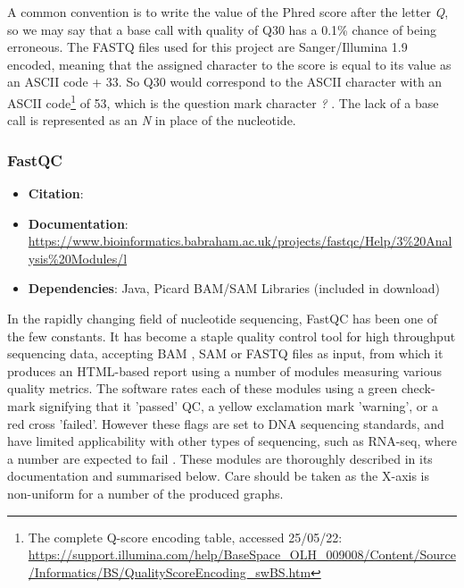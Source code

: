 A common convention is to write the value of the Phred score after the letter \textit{Q}, so we may say that a base call with quality of Q30 has a 0.1\% chance of being erroneous. The FASTQ files used for this project are Sanger/Illumina 1.9 encoded, meaning that the assigned character to the score is equal to its value as an ASCII code + 33. So Q30 would correspond to the ASCII character with an ASCII code\footnote{The complete Q-score encoding table, accessed 25/05/22: \url{https://support.illumina.com/help/BaseSpace_OLH_009008/Content/Source/Informatics/BS/QualityScoreEncoding_swBS.htm}} of 53, which is the question mark character \textit{?} \citep{ewing1998base}. The lack of a base call is represented as an \textit{N} in place of the nucleotide.

\subsubsection{FastQC}
\begin{itemize}\itemsep-0.5em
\item[] \textbf{Citation}: 				\cite{andrews2010fastqc}
\item[] \textbf{Documentation}: 	\url{https://www.bioinformatics.babraham.ac.uk/projects/fastqc/Help/3\%20Analysis\%20Modules/l}
\item[] \textbf{Dependencies}: Java, Picard BAM/SAM Libraries (included in download)
\end{itemize}
In the rapidly changing field of nucleotide sequencing, FastQC has been one of the few constants. It has become a staple quality control tool for high throughput sequencing data, accepting BAM \citep{BAM}, SAM \citep{li2009sequence} or FASTQ files as input, from which it produces an HTML-based report using a number of modules measuring various quality metrics. The software rates each of these modules using a green check-mark signifying that it 'passed' QC, a yellow exclamation mark 'warning', or a red cross 'failed'. However these flags are set to DNA sequencing standards, and have limited applicability with other types of sequencing, such as RNA-seq, where a number are expected to fail \citep{fastqctutorial2021}. These modules are thoroughly described in its documentation and summarised below. Care should be taken as the X-axis is non-uniform for a number of the produced graphs.

